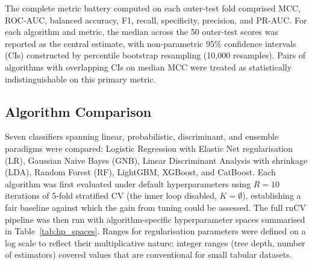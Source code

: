 The complete metric battery computed on each outer-test fold comprised MCC, ROC-AUC, balanced accuracy, F1, recall, specificity, precision, and PR-AUC. For each algorithm and metric, the median across the 50 outer-test scores was reported as the central estimate, with non-parametric 95\% confidence intervals (CIs) constructed by percentile bootstrap resampling (10,000 resamples). Pairs of algorithms with overlapping CIs on median MCC were treated as statistically indistinguishable on this primary metric.

\subsection{Algorithm Comparison}
\label{sec:algocomp}

Seven classifiers spanning linear, probabilistic, discriminant, and ensemble paradigms were compared: Logistic Regression with Elastic Net regularisation (LR), Gaussian Naive Bayes (GNB), Linear Discriminant Analysis with shrinkage (LDA), Random Forest (RF), LightGBM, XGBoost, and CatBoost. Each algorithm was first evaluated under default hyperparameters using $R=10$ iterations of 5-fold stratified CV (the inner loop disabled, $K = \emptyset$), establishing a fair baseline against which the gain from tuning could be assessed. The full rnCV pipeline was then run with algorithm-specific hyperparameter spaces summarised in Table~\ref{tab:hp_spaces}. Ranges for regularisation parameters were defined on a log scale to reflect their multiplicative nature; integer ranges (tree depth, number of estimators) covered values that are conventional for small tabular datasets.


